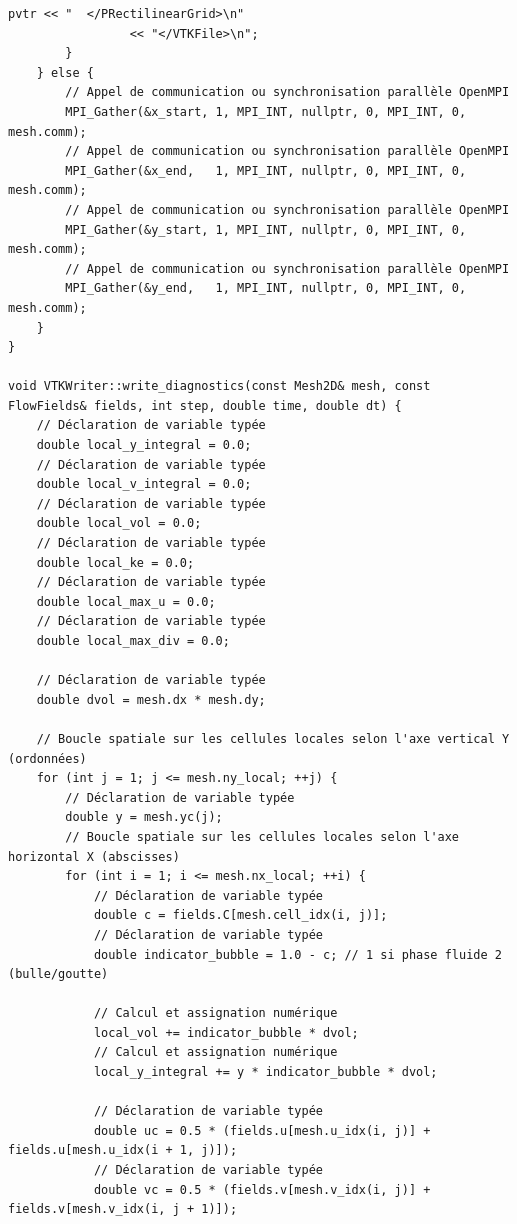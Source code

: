 \documentclass[10pt,a4paper,oneside]{book}
\begin{document}
\begin{lstlisting}[language={[11]C++}]
            pvtr << "  </PRectilinearGrid>\n"
                 << "</VTKFile>\n";
        }
    } else {
        // Appel de communication ou synchronisation parallèle OpenMPI
        MPI_Gather(&x_start, 1, MPI_INT, nullptr, 0, MPI_INT, 0, mesh.comm);
        // Appel de communication ou synchronisation parallèle OpenMPI
        MPI_Gather(&x_end,   1, MPI_INT, nullptr, 0, MPI_INT, 0, mesh.comm);
        // Appel de communication ou synchronisation parallèle OpenMPI
        MPI_Gather(&y_start, 1, MPI_INT, nullptr, 0, MPI_INT, 0, mesh.comm);
        // Appel de communication ou synchronisation parallèle OpenMPI
        MPI_Gather(&y_end,   1, MPI_INT, nullptr, 0, MPI_INT, 0, mesh.comm);
    }
}

void VTKWriter::write_diagnostics(const Mesh2D& mesh, const FlowFields& fields, int step, double time, double dt) {
    // Déclaration de variable typée
    double local_y_integral = 0.0;
    // Déclaration de variable typée
    double local_v_integral = 0.0;
    // Déclaration de variable typée
    double local_vol = 0.0;
    // Déclaration de variable typée
    double local_ke = 0.0;
    // Déclaration de variable typée
    double local_max_u = 0.0;
    // Déclaration de variable typée
    double local_max_div = 0.0;

    // Déclaration de variable typée
    double dvol = mesh.dx * mesh.dy;

    // Boucle spatiale sur les cellules locales selon l'axe vertical Y (ordonnées)
    for (int j = 1; j <= mesh.ny_local; ++j) {
        // Déclaration de variable typée
        double y = mesh.yc(j);
        // Boucle spatiale sur les cellules locales selon l'axe horizontal X (abscisses)
        for (int i = 1; i <= mesh.nx_local; ++i) {
            // Déclaration de variable typée
            double c = fields.C[mesh.cell_idx(i, j)];
            // Déclaration de variable typée
            double indicator_bubble = 1.0 - c; // 1 si phase fluide 2 (bulle/goutte)

            // Calcul et assignation numérique
            local_vol += indicator_bubble * dvol;
            // Calcul et assignation numérique
            local_y_integral += y * indicator_bubble * dvol;

            // Déclaration de variable typée
            double uc = 0.5 * (fields.u[mesh.u_idx(i, j)] + fields.u[mesh.u_idx(i + 1, j)]);
            // Déclaration de variable typée
            double vc = 0.5 * (fields.v[mesh.v_idx(i, j)] + fields.v[mesh.v_idx(i, j + 1)]);


\end{lstlisting}
\end{document}
